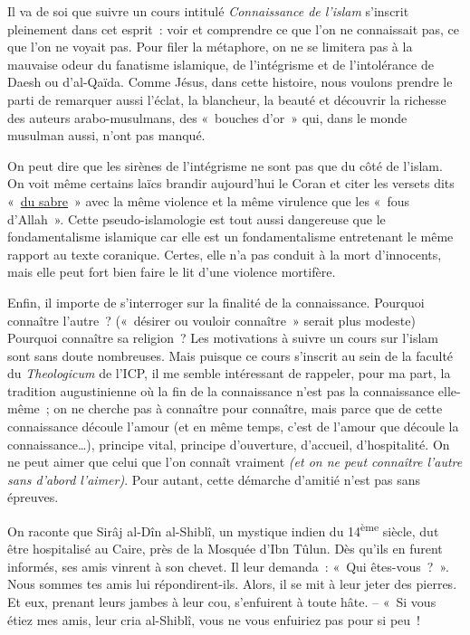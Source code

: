 Il va de soi que suivre un cours intitulé \emph{Connaissance de l'islam}
s'inscrit pleinement dans cet esprit~: voir et comprendre ce que l'on ne
connaissait pas, ce que l'on ne voyait pas. Pour filer la métaphore, on
ne se limitera pas à la mauvaise odeur du fanatisme islamique, de
l'intégrisme et de l'intolérance de Daesh ou d'al-Qaïda. Comme Jésus,
dans cette histoire, nous voulons prendre le parti de remarquer aussi
l'éclat, la blancheur, la beauté et découvrir la richesse des auteurs
arabo-musulmans, des «~bouches d'or~» qui, dans le monde musulman aussi,
n'ont pas manqué.

On peut dire que les sirènes de l'intégrisme ne sont pas que du côté de
l'islam. On voit même certains laïcs brandir aujourd'hui le Coran et
citer les versets dits «~\underline{du sabre}~» avec la même violence et
la même virulence que les «~fous d'Allah~». Cette pseudo-islamologie est
tout aussi dangereuse que le fondamentalisme islamique car elle est un
fondamentalisme entretenant le même rapport au texte coranique. Certes,
elle n'a pas conduit à la mort d'innocents, mais elle peut fort bien
faire le lit d'une violence mortifère.


Enfin, il importe de s'interroger sur la finalité de la connaissance.
Pourquoi connaître l'autre~? («~désirer ou vouloir connaître~» serait
plus modeste) Pourquoi connaître sa religion~? Les motivations à suivre
un cours sur l'islam sont sans doute nombreuses. Mais puisque ce cours
s'inscrit au sein de la faculté du \emph{Theologicum} de l'ICP, il me
semble intéressant de rappeler, pour ma part, la tradition augustinienne
où la fin de la connaissance n'est pas la connaissance elle-même~; on ne
cherche pas à connaître pour connaître, mais parce que de cette
connaissance découle l'amour (et en même temps, c'est de l'amour que
découle la connaissance\ldots), principe vital, principe d'ouverture,
d'accueil, d'hospitalité. On ne peut aimer que celui que l'on connaît
vraiment \emph{(et on ne peut connaître l'autre sans d'abord l'aimer)}.
Pour autant, cette démarche d'amitié n'est pas sans épreuves.

On raconte que Sirâj al-Dîn al-Shiblî, un mystique indien du
14\textsuperscript{ème} siècle, dut être hospitalisé au Caire, près de
la Mosquée d'Ibn Tûlun. Dès qu'ils en furent informés, ses amis vinrent
à son chevet. Il leur demanda~: «~Qui êtes-vous~?~». Nous sommes tes
amis lui répondirent-ils. Alors, il se mit à leur jeter des pierres. Et
eux, prenant leurs jambes à leur cou, s'enfuirent à toute hâte. -- «~Si
vous étiez mes amis, leur cria al-Shiblî, vous ne vous enfuiriez pas
pour si peu~!~

